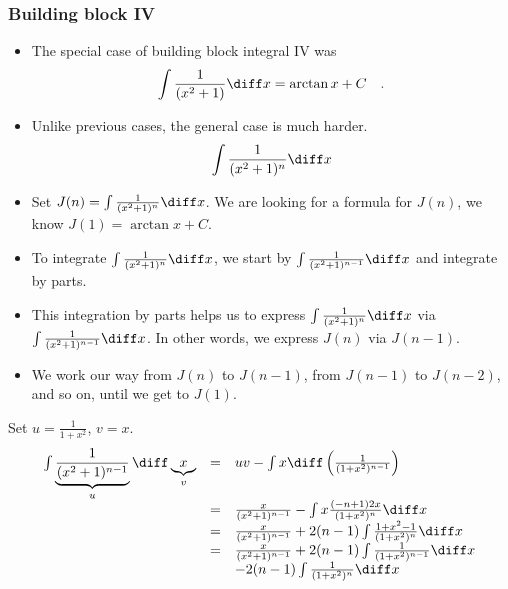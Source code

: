 
\begin{frame}
\frametitle{Building block IV}
\begin{itemize}
\item The special case of building block integral IV was \[
\int \frac{1}{(x^2+1)}\diff x=\arctan x+C\quad .
\] 
\item Unlike previous cases, the general case is much harder.
\[\int \frac{1}{(x^2+1)^n}\diff x
\] 
\item Set $J(n)=\int \frac{1}{(x^2+1)^n}\diff x$. We are looking for a formula for $J(n)$, we know $J(1)=\arctan x+C$.
\item To integrate $\int \frac{1}{(x^2+1)^n} \diff x$, we start by $\int \frac{1}{(x^2+1)^{n-1}} \diff x$ and integrate by parts.
\item This integration by parts helps us to express 
$\int \frac{1}{(x^2+1)^n} \diff x$ via $\int \frac{1}{(x^2+1)^{n-1}} \diff x$. In other words, we express $J(n)$ via $J(n-1)$.
\item We work our way from $J(n)$ to $J(n-1)$, from $J(n-1)$ to $J(n-2)$, and so on, until we get to $J(1)$.
\end{itemize} 
\end{frame}

\begin{frame}
\begin{example}
Set $u=\frac{1}{1+x^2}$, $v=x$.
\[
\begin{array}{rcl}
\int \underbrace{ \frac{1}{(x^2+1)^{n-1 }}}_{u}\diff \underbrace{x}_{v} &=& u v-\int  x \diff \left(\frac{1}{(1+x^2)^{n-1}}\right)\\
&=&\frac{x}{(x^2+1)^{n-1}}- \int x \frac{(-n+1)2x}{(1+x^2)^{n}}\diff x\\
&=&\frac{x}{(x^2+1)^{n-1}}+ 2(n-1)\int \frac{1+x^2-1}{(1+x^2)^n}\diff x\\
&=&\frac{x}{(x^2+1)^{n-1}}+ 2(n-1)\int \frac{1}{(1+x^2)^{n-1}}\diff x\\
&&-2(n-1)\int \frac{1}{(1+x^2)^n}\diff x\\

\end{array}
\]

\end{example}

\end{frame}


